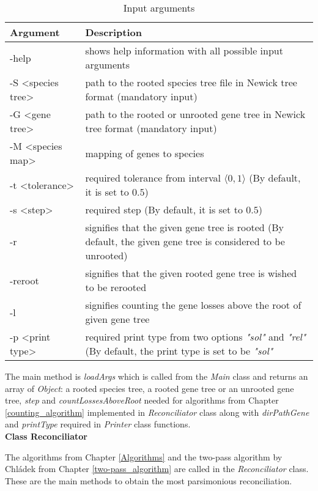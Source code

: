 \begin{table}[ht!]
\caption{Input arguments}
\centering
  \begin{tabular}{| p{} | p{} |}
  \hline
    \textbf{Argument}  & \textbf{Description}\\
    \hline
    -help & shows help information with all possible input arguments \\
    \hline
    -S <species tree> & path to the rooted species tree file in Newick tree format (mandatory input)\\
    \hline
    -G <gene tree> & path to the rooted or unrooted gene tree in Newick tree format (mandatory input)\\
    \hline
    -M <species map> & mapping of genes to species\\
    \hline
    -t <tolerance> & required tolerance from interval $\langle 0, 1 \rangle$ (By default, it is set to $0.5$) \\
    \hline
    -s <step> & required step (By default, it is set to $0.5$)\\
    \hline
    -r & signifies that the given gene tree is rooted (By default, the given gene tree is considered to be unrooted)\\
    \hline
    -reroot & signifies that the given rooted gene tree is wished to be rerooted\\
    \hline
    -l & signifies counting the gene losses above the root of given gene tree\\
    \hline
    -p <print type> & required print type from two options \emph{"sol"} and \emph{"rel"} (By default, the print type is set to be \emph{"sol"}\\
    \hline
  \end{tabular}
  \label{arguments}
\end{table}

The main method is \emph{loadArgs} which is called from the \emph{Main} class and returns an array of \emph{Object}: a rooted species tree, a rooted gene tree or an unrooted gene tree, \emph{step} and \emph{countLossesAboveRoot} needed for algorithms from Chapter \ref{counting_algorithm} implemented in \emph{Reconciliator} class along with \emph{dirPathGene} and \emph{printType} required in \emph{Printer} class functions.\\
\textbf{Class Reconciliator}

The algorithms from Chapter \ref{Algorithms} and the two-pass algorithm by Chládek from Chapter \ref{two-pass_algorithm} are called in the \emph{Reconciliator} class. These are the main methods to obtain the most parsimonious reconciliation.

